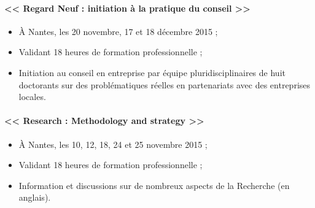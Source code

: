     \paragraph{<< Regard Neuf : initiation à la pratique du conseil >>}
    { \begin{itemize}
        \item À Nantes, les 20 novembre, 17 et 18 décembre 2015 ;
        \item Validant 18 heures de formation professionnelle ;
        \item Initiation au conseil en entreprise par équipe pluridisciplinaires
          de huit doctorants sur des problématiques réelles en partenariats avec
          des entreprises locales.
      \end{itemize} }

    \paragraph{<< Research : Methodology and strategy >>}
    { \begin{itemize}
        \item À Nantes, les 10, 12, 18, 24 et 25 novembre 2015 ;
        \item Validant 18 heures de formation professionnelle ;
        \item Information et discussions sur de nombreux aspects de
          la Recherche (en anglais).
      \end{itemize} }
  
